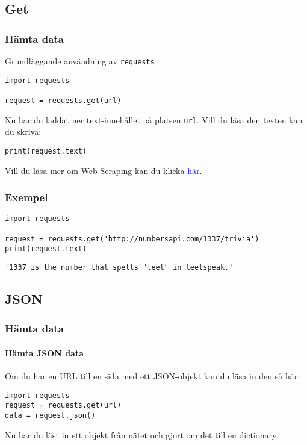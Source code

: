\documentclass[aspectratio=169]{beamer}
\begin{document}
\subsection{Get}

\begin{frame}[fragile]
\frametitle{Hämta data}

Grundläggande användning av \texttt{requests}

\begin{lstlisting}
import requests

request = requests.get(url)
\end{lstlisting}

Nu har du laddat ner text-innehållet på platsen \texttt{url}. Vill du läsa den texten kan du skriva:

\begin{lstlisting}
print(request.text)
\end{lstlisting}

Vill du läsa mer om Web Scraping kan du klicka \href{https://realpython.com/python-web-scraping-practical-introduction/}{\textcolor{blue}{\underline{här}}}.

\end{frame}

\begin{frame}[fragile]
\frametitle{Exempel}

\begin{lstlisting}
import requests

request = requests.get('http://numbersapi.com/1337/trivia')
print(request.text)
\end{lstlisting}

\begin{verbatim}
'1337 is the number that spells "leet" in leetspeak.'
\end{verbatim}

\end{frame}

\subsection{JSON}

\begin{frame}[fragile]
\frametitle{Hämta data}
\framesubtitle{Hämta JSON data}

Om du har en URL till en sida med ett JSON-objekt kan du läsa in den så här:

\begin{lstlisting}
import requests
request = requests.get(url)
data = request.json()
\end{lstlisting}

Nu har du läst in ett objekt från nätet och gjort om det till en dictionary.

\end{frame}
\end{document}
